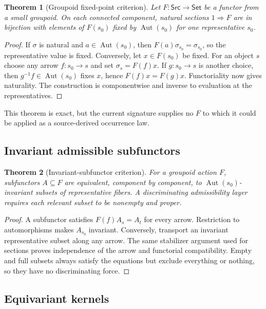 \documentclass[11pt]{article}
\newtheorem{theorem}{Theorem}
\newcommand{\Src}{\mathsf{Src}}
\newcommand{\Aut}{\operatorname{Aut}}
\begin{document}
\begin{theorem}[Groupoid fixed-point criterion]
Let $F:\Src\to\mathsf{Set}$ be a functor from a small groupoid.  On each
connected component, natural sections $1\Rightarrow F$ are in bijection with
elements of $F(s_0)$ fixed by $\Aut(s_0)$ for one representative $s_0$.
\end{theorem}

\begin{proof}
If $\sigma$ is natural and $a\in\Aut(s_0)$, then
$F(a)\sigma_{s_0}=\sigma_{s_0}$, so the representative value is fixed.
Conversely, let $x\in F(s_0)$ be fixed.  For an object $s$ choose any arrow
$f:s_0\to s$ and set $\sigma_s=F(f)x$.  If $g:s_0\to s$ is another choice,
then $g^{-1}f\in\Aut(s_0)$ fixes $x$, hence $F(f)x=F(g)x$.  Functoriality now
gives naturality.  The construction is componentwise and inverse to
evaluation at the representatives.
\end{proof}

This theorem is exact, but the current signature supplies no $F$ to which it
could be applied as a source-derived occurrence law.

\subsection{Invariant admissible subfunctors}

\begin{theorem}[Invariant-subfunctor criterion]
For a groupoid action $F$, subfunctors $A\subseteq F$ are equivalent,
component by component, to $\Aut(s_0)$-invariant subsets of representative
fibers.  A discriminating admissibility layer requires each relevant subset
to be nonempty and proper.
\end{theorem}

\begin{proof}
A subfunctor satisfies $F(f)A_s=A_t$ for every arrow.  Restriction to
automorphisms makes $A_{s_0}$ invariant.  Conversely, transport an invariant
representative subset along any arrow.  The same stabilizer argument used for
sections proves independence of the arrow and functorial compatibility.
Empty and full subsets always satisfy the equations but exclude everything or
nothing, so they have no discriminating force.
\end{proof}

\subsection{Equivariant kernels}
\end{document}
